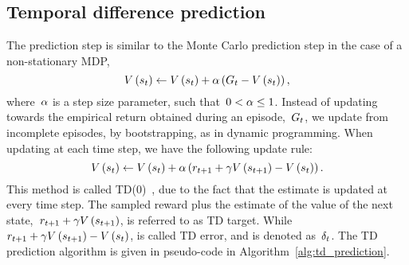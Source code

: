 \subsection{Temporal difference prediction} \label{sec:td_prediction}
The prediction step is similar to the Monte Carlo prediction step in the case of a non-stationary MDP,
\begin{equation}
	\estimatestatevalue\left(\randomstate_{\timestep}\right)\gets\estimatestatevalue\left(\randomstate_{\timestep}\right)+\robbinsmonro\left(\return_{\timestep}-\estimatestatevalue\left(\randomstate_{\timestep}\right)\right),
\end{equation}
where~${\alpha}$ is a step size parameter, such that~${0<\alpha\leq1}$. Instead of updating towards the empirical return obtained during an episode,~${G_{t}}$, we update from incomplete episodes, by bootstrapping, as in dynamic programming. When updating at each time step, we have the following update rule:
\begin{equation} \label{eq:td_update}
	\estimatestatevalue\left(\randomstate_{\timestep}\right)\gets\estimatestatevalue\left(\randomstate_{\timestep}\right)+\robbinsmonro\left(\randomreward_{\timestep+1}+\discount\statevalue\left(\randomstate_{\timestep+1}\right)-\estimatestatevalue\left(\randomstate_{\timestep}\right)\right).
\end{equation}
This method is called TD(0)~{\cite{sutton1988td}}, due to the fact that the estimate is updated at every time step. The sampled reward plus the estimate of the value of the next state,~${r_{t+1}+\gamma V\left(s_{t+1}\right)}$, is referred to as TD target. While ~${\randomreward_{\timestep+1}+\discount\estimatestatevalue\left(\randomstate_{\timestep+1}\right)-\estimatestatevalue\left(\randomstate_{\timestep}\right)}$, is called TD error, and is denoted as~${\delta_{t}}$. The TD prediction algorithm is given in pseudo-code in Algorithm~\ref{alg:td_prediction}.
